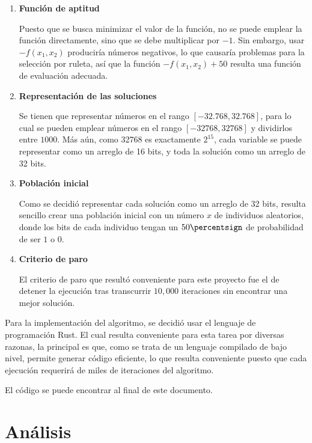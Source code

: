 \documentclass[12pt]{article} %
\begin{document}
\begin{enumerate}
    \item \textbf{Función de aptitud}

          Puesto que se busca minimizar el valor de la función, no se puede emplear
          la función directamente, sino que se debe multiplicar por $-1$. Sin embargo,
          usar $-f(x_1, x_2)$ produciría números negativos, lo que causaría problemas
          para la selección por ruleta, así que la función $-f(x_1, x_2) + 50$ resulta
          una función de evaluación adecuada.

    \item \textbf{Representación de las soluciones}

          Se tienen que representar números en el rango $[-32.768, 32.768]$, para
          lo cual se pueden emplear números en el rango $[-32768, 32768]$ y dividirlos
          entre $1000$. Más aún, como 32768 es exactamente $2^{15}$, cada variable se
          puede representar como un arreglo de 16 bits, y toda la solución como un
          arreglo de 32 bits.

    \item \textbf{Población inicial}

          Como se decidió representar cada solución como un arreglo de 32 bits, resulta
          sencillo crear una población inicial con un número $x$ de individuos aleatorios,
          donde los bits de cada individuo tengan un $50\percentsign$ de probabilidad de
          ser $1$ o $0$.

    \item \textbf{Criterio de paro}

          El criterio de paro que resultó conveniente para este proyecto fue el de
          detener la ejecución tras transcurrir $10,000$ iteraciones sin encontrar
          una mejor solución.
\end{enumerate}

Para la implementación del algoritmo, se decidió usar el lenguaje de programación
Rust. El cual resulta conveniente para esta tarea por diversas razonas,
la principal es que, como se trata de un lenguaje compilado de bajo nivel,
permite generar código eficiente, lo que resulta conveniente puesto que cada
ejecución requerirá de miles de iteraciones del algoritmo.

El código se puede encontrar al final de este documento.

\section{Análisis}
\end{document}
